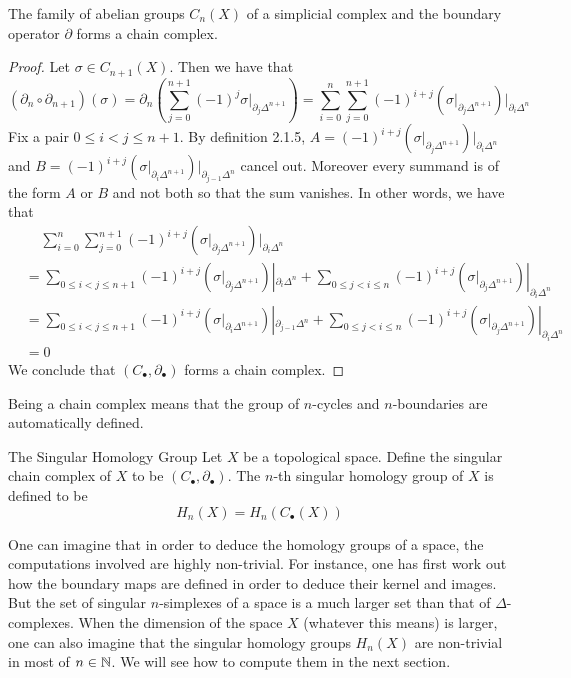 \documentclass[a4paper]{article}
\begin{document}
\begin{prp}{}{} The family of abelian groups $C_n(X)$ of a simplicial complex and the boundary operator $\partial$ forms a chain complex. \tcbline
\begin{proof}
Let $\sigma\in C_{n+1}(X)$. Then we have that $$(\partial_n\circ\partial_{n+1})(\sigma)=\partial_n\left(\sum_{j=0}^{n+1}(-1)^j\sigma|_{\partial_j\Delta^{n+1}}\right)=\sum_{i=0}^n\sum_{j=0}^{n+1}(-1)^{i+j}\left(\sigma|_{\partial_j\Delta^{n+1}}\right)|_{\partial_i\Delta^n}$$ Fix a pair $0\leq i<j\leq n+1$. By definition 2.1.5, $A=(-1)^{i+j}\left(\sigma|_{\partial_j\Delta^{n+1}}\right)|_{\partial_i\Delta^n}$ and $B=(-1)^{i+j}\left(\sigma|_{\partial_i\Delta^{n+1}}\right)|_{\partial_{j-1}\Delta^n}$ cancel out. Moreover every summand is of the form $A$ or $B$ and not both so that the sum vanishes. In other words, we have that 
\begin{align*}
&\;\;\;\;\sum_{i=0}^n\sum_{j=0}^{n+1}(-1)^{i+j}\left(\sigma|_{\partial_j\Delta^{n+1}}\right)|_{\partial_i\Delta^n}\\
&=\sum_{0\leq i<j\leq n+1}(-1)^{i+j}\left(\sigma|_{\partial_j\Delta^{n+1}}\right)|_{\partial_i\Delta^n}+\sum_{0\leq j<i\leq n}(-1)^{i+j}\left(\sigma|_{\partial_j\Delta^{n+1}}\right)|_{\partial_i\Delta^n}\\
&=\sum_{0\leq i<j\leq n+1}(-1)^{i+j}\left(\sigma|_{\partial_i\Delta^{n+1}}\right)|_{\partial_{j-1}\Delta^n}+\sum_{0\leq j<i\leq n}(-1)^{i+j}\left(\sigma|_{\partial_j\Delta^{n+1}}\right)|_{\partial_i\Delta^n}\\
&=0
\end{align*}
We conclude that $(C_\bullet,\partial_\bullet)$ forms a chain complex. 
\end{proof}
\end{prp}

Being a chain complex means that the group of $n$-cycles and $n$-boundaries are automatically defined. 

\begin{defn}{The Singular Homology Group}{} Let $X$ be a topological space. Define the singular chain complex of $X$ to be $(C_\bullet,\partial_\bullet)$. The $n$-th singular homology group of $X$ is defined to be $$H_n(X)=H_n(C_\bullet(X))$$
\end{defn}

One can imagine that in order to deduce the homology groups of a space, the computations involved are highly non-trivial. For instance, one has first work out how the boundary maps are defined in order to deduce their kernel and images. But the set of singular $n$-simplexes of a space is a much larger set than that of $\Delta$-complexes. When the dimension of the space $X$ (whatever this means) is larger, one can also imagine that the singular homology groups $H_n(X)$ are non-trivial in most of $n\in\mathbb{N}$. We will see how to compute them in the next section. \\~\\
\end{document}
